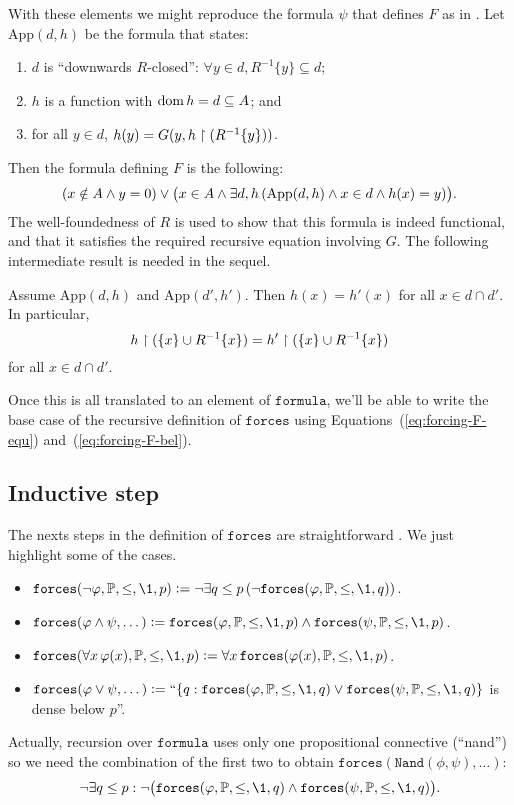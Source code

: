 \documentclass[11pt,english]{article}
\renewcommand{\PP}{\mathbb{P}}
\renewcommand{\app}{\mathrm{App}}
\newcommand{\formula}{\ensuremath{\mathtt{formula}}}
\newcommand{\forceisa}{\mathtt{forces}}
\begin{document}
With these elements we might reproduce the formula $\psi$ that defines
$F$ as in \cite[p.~49]{kunen2011set}. Let  $\app(d,h)$  be the formula
that states:
\begin{enumerate}
\item \label{item:dom-R-cerrado} $d$ is ``downwards $R$-closed'':
  $\forall y \in d, 
  R^{-1}\{y\}\subseteq d$;
\item \label{item:4} $h$ is a function with $\operatorname{dom} h =d \subseteq A$; and
\item \label{item:3} for all $y\in d$, $h(y) = G(y,h\upharpoonright(R^{-1}\{y\}))$.
\end{enumerate}
Then the formula defining $F$ is the following:
\[
(x\notin A \y y=0) \o \bigl(x\in A \y \exists d,h\, (\app(d,h)\y
x\in d \y h(x)=y)\bigr).
\]
The well-foundedness of $R$ is used to show that this formula is indeed
functional, and that it satisfies the required recursive equation
involving $G$. The following intermediate result is needed in the
sequel.
\begin{lemma}\label{lem:uniq-approx}
  Assume $\app(d,h)$ and $\app(d',h')$. Then
  $h(x)=h'(x)$ for all  $x\in d \cap d'$. In particular,
  \[
  h\upharpoonright(\{x\}\cup R^{-1}\{x\})=h'\upharpoonright(\{x\}\cup R^{-1}\{x\})
  \]
  for  all $x\in d \cap d'$. 
\end{lemma}

  

Once this is all translated to an element of \formula,
we'll be able to write the base case of the recursive definition of
$\forceisa$ using Equations~(\ref{eq:forcing-F-equ})
and~(\ref{eq:forcing-F-bel}).
 
\subsection{Inductive step}
%
The nexts steps in the definition of $\forceisa$ are straightforward
\cite[IV.2.42]{kunen2011set}. We just highlight some of the cases.
\begin{itemize}
\item $\forceisa(\neg\phi,\PP,\leq,\1,p) \defi \neg\exists
  q\leq p \,(\neg \forceisa(\phi,\PP,\leq,\1,q))$.
\item
  $\forceisa(\phi\y\psi,\dots)\defi\forceisa(\phi,\PP,\leq,\1,p)\y\forceisa(\psi,\PP,\leq,\1,p)$.
\item $\forceisa(\forall x\,\phi(x),\PP,\leq,\1,p)\defi \forall x\,\forceisa(\phi(x),\PP,\leq,\1,p)$. 
\item
  $\forceisa(\phi\o\psi,\dots)\defi\text{``}\{q:\forceisa(\phi,\PP,\leq,\1,q)\o\forceisa(\psi,\PP,\leq,\1,q)\}$
  is dense below $p$''. 
\end{itemize}
%
Actually, recursion over $\formula$ uses only one propositional
connective (``nand'') so we need the combination of the first two to
obtain $\forceisa(\mathtt{Nand(\phi,\psi)},\dots)$:
\[
\neg\exists
  q\leq p :\neg\bigl(\forceisa(\phi,\PP,\leq,\1,q)\y\forceisa(\psi,\PP,\leq,\1,q)\bigr).
\]
\end{document}
